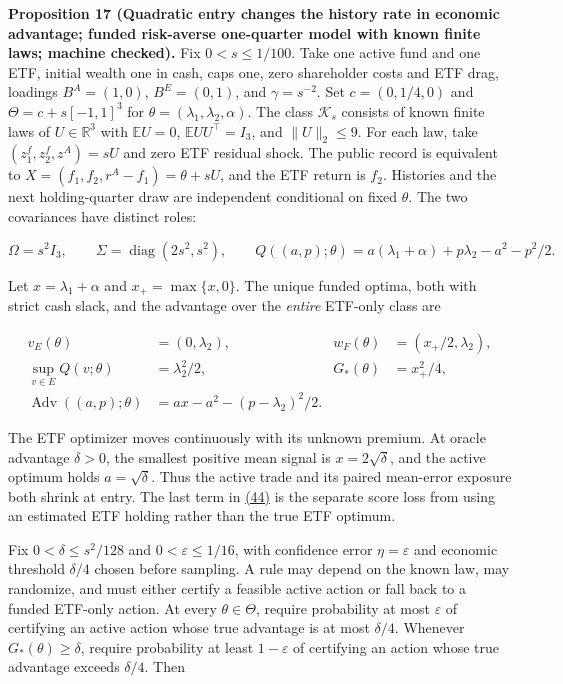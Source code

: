 \documentclass[11pt]{article}
\begin{document}
\label{res:Proposition-17}
\textbf{Proposition 17 (Quadratic entry changes the history rate in economic advantage; funded risk-averse one-quarter model with known finite laws; machine checked).}
Fix \(0<s\leq1/100\). Take one active fund and one ETF,
initial wealth one in cash, caps one, zero shareholder costs
and ETF drag, loadings \(B^A=(1,0)\), \(B^E=(0,1)\), and
\(\gamma=s^{-2}\). Set
\(c=(0,1/4,0)\) and
\(\Theta=c+s[-1,1]^3\) for
\(\theta=(\lambda_1,\lambda_2,\alpha)\). The class
\(\mathcal K_s\) consists of known finite laws of
\(U\in\mathbb R^3\) with
\(\mathbb E U=0\), \(\mathbb E UU^\top=I_3\), and
\(\|U\|_2\leq9\). For each law, take
\((z^f_1,z^f_2,z^A)=sU\) and zero ETF residual shock.
The public record is equivalent to
\(X=(f_1,f_2,r^A-f_1)=\theta+sU\), and the ETF return is
\(f_2\). Histories and the next holding-quarter draw are
independent conditional on fixed \(\theta\). The two
covariances have distinct roles:

\begin{equation*}
\Omega=s^2I_3,\qquad
\Sigma=\operatorname{diag}(2s^2,s^2),\qquad
Q((a,p);\theta)=a(\lambda_1+\alpha)+p\lambda_2-a^2-p^2/2.
\tag{43}\label{eq:43}
\end{equation*}

Let \(x=\lambda_1+\alpha\) and \(x_+=\max\{x,0\}\).
The unique funded optima, both with strict cash slack, and
the advantage over the \emph{entire} ETF-only class are

\begin{equation*}
\begin{aligned}
v_E(\theta)&=(0,\lambda_2),&
w_F(\theta)&=(x_+/2,\lambda_2),\\
\sup_{v\in E}Q(v;\theta)&=\lambda_2^2/2,&
G_*(\theta)&=x_+^2/4,\\
\operatorname{Adv}((a,p);\theta)
 &=a x-a^2-(p-\lambda_2)^2/2.
\end{aligned}\tag{44}\label{eq:44}
\end{equation*}

The ETF optimizer moves continuously with its unknown
premium. At oracle advantage \(\delta>0\), the smallest
positive mean signal is \(x=2\sqrt\delta\), and the active
optimum holds \(a=\sqrt\delta\). Thus the active trade and
its paired mean-error exposure both shrink at entry. The
last term in \hyperref[eq:44]{(44)} is the separate score loss from using an
estimated ETF holding rather than the true ETF optimum.

Fix \(0<\delta\leq s^2/128\) and
\(0<\varepsilon\leq1/16\), with confidence error
\(\eta=\varepsilon\) and economic threshold \(\delta/4\)
chosen before sampling. A rule may depend on the known law,
may randomize, and must either certify a feasible active
action or fall back to a funded ETF-only action. At every
\(\theta\in\Theta\), require probability at most
\(\varepsilon\) of certifying an active action whose true
advantage is at most \(\delta/4\). Whenever
\(G_*(\theta)\geq\delta\), require probability at least
\(1-\varepsilon\) of certifying an action whose true
advantage exceeds \(\delta/4\). Then
\end{document}
